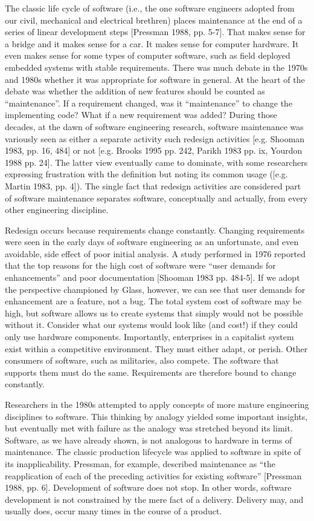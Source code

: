 The classic life cycle of software (i.e., the one software engineers adopted from our civil, mechanical and electrical brethren) places maintenance at the end of a series of linear development steps [Pressman 1988, pp. 5-7].  That makes sense for a bridge and it makes sense for a car.  It makes sense for computer hardware.  It even makes sense for some types of computer software, such as field deployed embedded systems with stable requirements.  There was much debate in the 1970s and 1980s whether it was appropriate for software in general.  At the heart of the debate was whether the addition of new features should be counted as ``maintenance''.  If a requirement changed, was it ``maintenance'' to change the implementing code?  What if a new requirement was added?  During those decades, at the dawn of software engineering research, software maintenance was variously seen as either a separate activity such redesign activities [e.g. Shooman 1983, pp. 16, 484] or not [e.g. Brooks 1995 pp. 242, Parikh 1983 pp. ix, Yourdon 1988 pp. 24].  The latter view eventually came to dominate, with some researchers expressing frustration with the definition but noting its common usage ([e.g. Martin 1983, pp. 4]).  The single fact that redesign activities are considered part of software maintenance separates software, conceptually and actually, from every other engineering discipline.

Redesign occurs because requirements change constantly.  Changing requirements were seen in the early days of software engineering as an unfortunate, and even avoidable, side effect of poor initial analysis. A study performed in 1976 reported that the top reasons for the high cost of software were ``user demands for enhancements'' and poor documentation [Shooman 1983 pp. 484-5].  If we adopt the perspective championed by Glass, however, we can see that user demands for enhancement are a feature, not a bug.  The total system cost of software may be high, but software allows us to create systems that simply would not be possible without it.  Consider what our systems would look like (and cost!) if they could only use hardware components.  Importantly, enterprises in a capitalist system exist within a competitive environment.  They must either adapt, or perish.  Other consumers of software, such as militaries, also compete.  The software that supports them must do the same.  Requirements are therefore bound to change constantly.

Researchers in the 1980s attempted to apply concepts of more mature engineering disciplines to software.  This thinking by analogy yielded some important insights, but eventually met with failure as the analogy was stretched beyond its limit.  Software, as we have already shown, is not analogous to hardware in terms of maintenance.  The classic production lifecycle was applied to software in spite of its inapplicability.  Pressman, for example, described maintenance as ``the reapplication of each of the preceding activities for existing software'' [Pressman 1988, pp. 6].  Development of software does not stop.  In other words, software development is not constrained by the mere fact of a delivery.  Delivery may, and usually does, occur many times in the course of a product.

